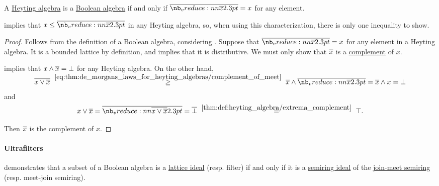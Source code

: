 \begin{proposition}\label{thm:boolean_algebra_heyting_characterization}
  A \hyperref[def:heyting_algebra]{Heyting algebra} is a \hyperref[def:boolean_algebra]{Boolean algebra} if and only if \( \doline{x} = x \) for any element.
\end{proposition}
\begin{comments}
  \item {} implies that \( x \leq \doline{x} \) in any Heyting algebra, so, when using this characterization, there is only one inequality to show.
\end{comments}
\begin{proof}
  \SufficiencySubProof Follows from the definition of a Boolean algebra, considering .
  \NecessitySubProof Suppose that \( \doline{x} = x \) for any element in a Heyting algebra. It is a bounded lattice by definition, and  implies that it is distributive. We must only show that \( \oline{x} \) is a \hyperref[def:bounded_lattice_complement]{complement} of \( x \).

   implies that \( x \wedge \oline{x} = \bot \) for any Heyting algebra. On the other hand,
  \begin{equation*}
    \oline{x \vee \oline{x}}
    \reloset {\eqref{eq:thm:de_morgans_laws_for_heyting_algebras/complement_of_meet}} \geq
    \oline{x} \wedge \doline{x}
    =
    \oline{x} \wedge x
    =
    \bot
  \end{equation*}
  and
  \begin{equation*}
    x \vee \oline{x}
    =
    \doline{x \vee \oline{x}}
    =
    \oline{\bot}
    \reloset {\ref{thm:def:heyting_algebra/extrema_complement}} =
    \top.
  \end{equation*}

  Then \( \oline{x} \) is the complement of \( x \).
\end{proof}

\paragraph{Ultrafilters}

\begin{remark}\label{rem:boolean_algebra_ideal}
   demonstrates that a subset of a Boolean algebra is a \hyperref[def:lattice_ideal]{lattice ideal} (resp. filter) if and only if it is a \hyperref[def:semiring_ideal]{semiring ideal} of the \hyperref[ex:def:semiring/lattice]{join-meet semiring} (resp. meet-join semiring).
\end{remark}


